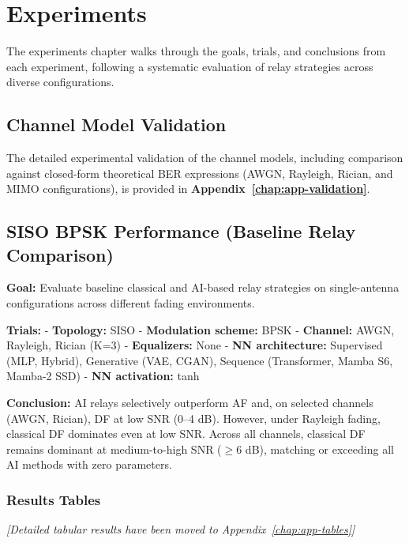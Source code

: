 \chapter{Experiments}\label{sec:experiments}

The experiments chapter walks through the goals, trials, and conclusions from each experiment, following a systematic evaluation of relay strategies across diverse configurations.

\section{Channel Model Validation}\label{sec:channel-model-validation}

The detailed experimental validation of the channel models, including comparison against closed-form theoretical BER expressions (AWGN, Rayleigh, Rician, and MIMO configurations), is provided in \textbf{Appendix~\ref{chap:app-validation}}.

\section{SISO BPSK Performance (Baseline Relay Comparison)}\label{sec:siso-bpsk-performance-baseline-relay-comparison}

\textbf{Goal:} Evaluate baseline classical and AI-based relay strategies on single-antenna configurations across different fading environments.

\textbf{Trials:} - \textbf{Topology:} SISO - \textbf{Modulation scheme:} BPSK - \textbf{Channel:} AWGN, Rayleigh, Rician (K=3) - \textbf{Equalizers:} None - \textbf{NN architecture:} Supervised (MLP, Hybrid), Generative (VAE, CGAN), Sequence (Transformer, Mamba S6, Mamba-2 SSD) - \textbf{NN activation:} tanh

\textbf{Conclusion:} AI relays selectively outperform AF and, on selected channels (AWGN, Rician), DF at low SNR (0--4 dB). However, under Rayleigh fading, classical DF dominates even at low SNR. Across all channels, classical DF remains dominant at medium-to-high SNR (\(\geq 6\) dB), matching or exceeding all AI methods with zero parameters.

\subsection{Results Tables}\label{sec:results-tables}

\textit{[Detailed tabular results have been moved to Appendix~\ref{chap:app-tables}]}


